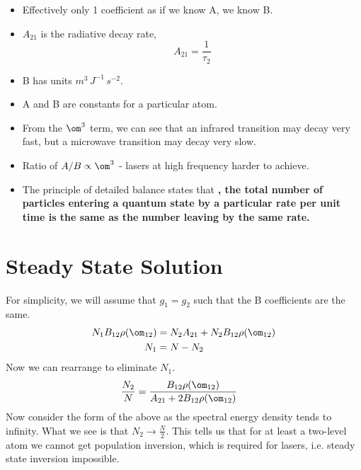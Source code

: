 \documentclass[a4paper, 11pt, normalem]{report}
\begin{document}
\begin{itemize}
    \item Effectively only 1 coefficient as if we know A, we know B. 
    \item $A_{21}$ is the radiative decay rate,
        \begin{equation}
            A_{21} = \frac{1}{\tau_2}
        \end{equation}
    \item B has units $m^3\,J^{-1}\,s^{-2}$.
    \item A and B are constants for a particular atom.
    \item From the $\om^3$ term, we can see that an infrared transition may decay very fast, but a microwave transition may decay very slow. 
    \item Ratio of $A/B \propto \om^3$ - lasers at high frequency harder to achieve.
    \item The principle of detailed balance states that \textbf{, the total number of particles entering a quantum state by a particular rate per unit time is the same as the number leaving by the same rate.}
\end{itemize}

\section{Steady State Solution}
For simplicity, we will assume that $g_1=g_2$ such that the B coefficients are the same. 
\begin{align}
    N_1B_{12}\rho(\om_{12}) &= N_2A_{21} + N_2B_{12}\rho(\om_{12}) \\
    N_1 &= N - N_2
\end{align}
Now we can rearrange to eliminate $N_1$.
\begin{align}
    \frac{N_2}{N} &= \frac{B_{12}\rho(\om_{12})}{A_{21}+2B_{12}\rho(\om_{12})}
\end{align}
Now consider the form of the above as the spectral energy density tends to infinity. 
What we see  is that $N_2 \to \frac{N}{2}$.
This tells us that for at least a two-level atom we cannot get population inversion, which is required for lasers, i.e. steady state inversion impossible.
\end{document}
